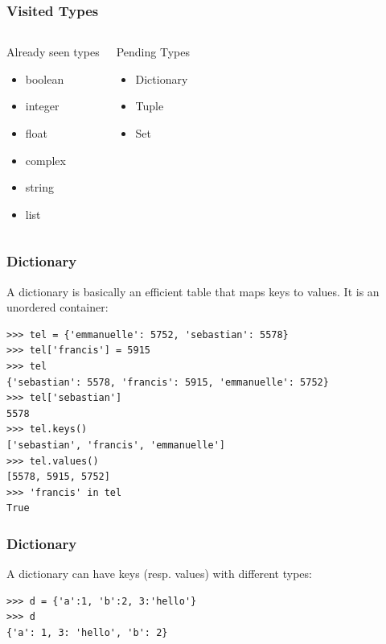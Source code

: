 \documentclass[colorlinks]{beamer}
\begin{document}
\begin{frame}[fragile]\frametitle{Visited Types}
\begin{columns}[T]
\begin{block}{Already seen types}
\begin{itemize}
    \item boolean
\item integer
\item float
\item complex
\item string
\item list
\end{itemize}
\end{block}
\begin{block}{Pending Types}
\begin{itemize}
    \item Dictionary
\item Tuple
\item Set
\end{itemize}
\end{block}
\end{columns}

\end{frame}


\begin{frame}[fragile]\frametitle{Dictionary}
  \begin{block}{A dictionary is basically an efficient table that maps keys to values. It is an unordered container:}
\tiny
\begin{verbatim}
>>> tel = {'emmanuelle': 5752, 'sebastian': 5578}
>>> tel['francis'] = 5915
>>> tel
{'sebastian': 5578, 'francis': 5915, 'emmanuelle': 5752}
>>> tel['sebastian']
5578
>>> tel.keys()
['sebastian', 'francis', 'emmanuelle']
>>> tel.values()
[5578, 5915, 5752]
>>> 'francis' in tel
True
\end{verbatim}

  \end{block}
\end{frame}

\begin{frame}[fragile]\frametitle{Dictionary}
\begin{block}{A dictionary can have keys (resp. values) with different types:}
\begin{verbatim}
>>> d = {'a':1, 'b':2, 3:'hello'}
>>> d
{'a': 1, 3: 'hello', 'b': 2}
\end{verbatim}

\end{block}
\end{frame}
\end{document}
